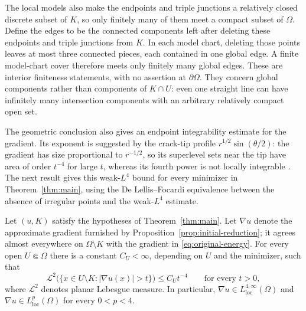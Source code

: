 \begin{remark}
The local models also make the endpoints and triple junctions a relatively
closed discrete subset of $K$, so only finitely many of them meet a compact
subset of $\Omega$.  Define the edges to be the connected components left
after deleting these endpoints and triple junctions from $K$.  In each model
chart, deleting those points leaves at most three connected pieces, each
contained in one global edge.  A finite model-chart cover therefore meets only
finitely many global edges.  These are interior finiteness statements, with
no assertion at $\partial\Omega$.  They concern global components rather than
components of $K\cap U$: even one straight line can have infinitely many
intersection components with an arbitrary relatively compact open set.
\end{remark}

The geometric conclusion also gives an endpoint integrability estimate for
the gradient.  Its exponent is suggested by the crack-tip profile
$r^{1/2}\sin(\theta/2)$: the gradient has size proportional to $r^{-1/2}$,
so its superlevel sets near the tip have area of order $t^{-4}$ for large
$t$, whereas its fourth power is not locally integrable
\cite[Section~1.4]{delellis_focardi2025}.  The next result gives this
weak-$L^4$ bound for every minimizer in Theorem~\ref{thm:main}, using the
De Lellis--Focardi equivalence between the absence of irregular points and
the weak-$L^4$ estimate.

\begin{corollary}\label{cor:weak-l4}
Let $(u,K)$ satisfy the hypotheses of Theorem~\ref{thm:main}.
Let $\nabla u$ denote the approximate gradient furnished by
Proposition~\ref{prop:initial-reduction}; it agrees almost everywhere on
$\Omega\setminus K$ with the gradient in \eqref{eq:original-energy}.
For every open $U\Subset\Omega$ there is a constant $C_U<\infty$,
depending on $U$ and the minimizer, such that
\begin{equation}\label{eq:weak-l4}
 \mathcal L^2\bigl(\{x\in U\setminus K:|\nabla u(x)|>t\}\bigr)
 \le C_Ut^{-4}\qquad\text{for every }t>0,
\end{equation}
where $\mathcal L^2$ denotes planar Lebesgue measure. In particular,
$\nabla u\in L^{4,\infty}_{\mathrm{loc}}(\Omega)$ and
$\nabla u\in L^p_{\mathrm{loc}}(\Omega)$ for every $0<p<4$.
\end{corollary}

